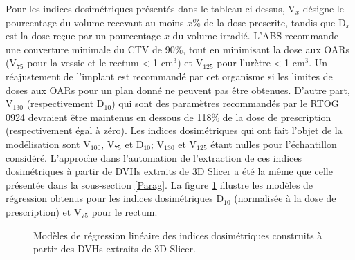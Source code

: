 Pour les indices dosimétriques présentés dans le tableau ci-dessus, V$_{x}$ désigne le pourcentage du volume recevant au moins $x$\% de la dose prescrite, tandis que D$_{x}$ est la dose reçue par un pourcentage $x$ du volume irradié. L'ABS recommande une couverture minimale du CTV de 90\%, tout en minimisant la dose aux OARs (V$_{75}$ pour la vessie et le rectum < 1 cm$^{3}$) et V$_{125}$ pour l'urètre < 1 cm$^{3}$. Un réajustement de l’implant est recommandé par cet organisme si les limites de doses aux OARs pour un plan donné ne peuvent pas être obtenues. D'autre part, V$_{130}$ (respectivement D$_{10}$) qui sont des paramètres recommandés par le RTOG 0924 devraient être maintenus en dessous de 118\% de la dose de prescription (respectivement égal à zéro). Les indices dosimétriques qui ont fait l'objet de la modélisation sont V$_{100}$, V$_{75}$ et D$_{10}$; V$_{130}$ et V$_{125}$ étant nulles pour l'échantillon considéré. L'approche dans l'automation de l'extraction de ces indices dosimétriques à partir de DVHs extraits de 3D Slicer a été la même que celle présentée dans la sous-section \ref{Parag}. La figure \ref{ModeleRegresIndice} illustre les modèles de régression obtenus pour les indices dosimétriques D$_{10}$ (normalisée à la dose de prescription) et V$_{75}$ pour le rectum.
%
\begin{figure}[ht!]
  \centering
  \hspace{0.5cm}
  \hspace{0.5cm}
\caption{\label{ModeleRegresIndice} Modèles de régression linéaire des indices dosimétriques construits à partir des DVHs extraits de 3D Slicer.}
\end{figure}
%
